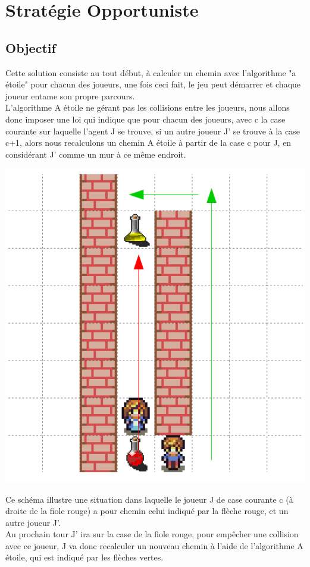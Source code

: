 \documentclass{article}
\begin{document}
\section{Stratégie Opportuniste}
	\subsection{Objectif}
		Cette solution consiste au tout début, à calculer un chemin avec
		l'algorithme "a étoile" pour chacun des joueurs, une fois ceci fait, le jeu peut démarrer et chaque joueur entame son propre parcours.\\ 
L'algorithme A étoile ne gérant pas les collisions entre les joueurs, nous allons donc imposer une loi qui indique que pour chacun des joueurs, avec c la case courante sur laquelle l'agent J se trouve, si un autre joueur J' se trouve à la case c+1, alors nous recalculons un chemin A étoile à partir de la case c pour J, en considérant J' comme un mur à ce même endroit.
\begin{center}
	\includegraphics[scale=0.7]{Solution1_ex}
\end{center}
	Ce schéma illustre une situation dans laquelle le joueur J de case courante c (à droite de la fiole rouge) a pour chemin celui indiqué par la flèche rouge, et un autre joueur J'.\\
	Au prochain tour J' ira sur la case de la fiole rouge, pour empêcher une collision avec ce joueur, J va donc recalculer un nouveau chemin à l'aide de l'algorithme A étoile, qui est indiqué par les flèches vertes.
\end{document}
